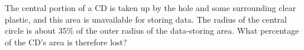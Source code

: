   The central portion of a CD is taken up by the hole
and some surrounding clear plastic, and this area is
unavailable for storing data. The radius of the central
circle is about 35\% of the outer radius of the data-storing area.
What percentage of the CD's area is therefore lost? \answercheck
